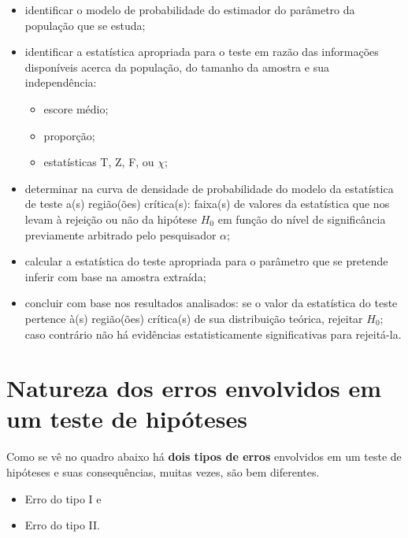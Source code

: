 \documentclass[
]{book}
\providecommand{\tightlist}{%
  \setlength{\itemsep}{0pt}\setlength{\parskip}{0pt}}
\begin{document}
\begin{itemize}
\tightlist
\item
  identificar o modelo de probabilidade do estimador do parâmetro da população que se estuda;\\
\item
  identificar a estatística apropriada para o teste em razão das informações disponíveis acerca da população, do tamanho da amostra e sua independência:

  \begin{itemize}
  \tightlist
  \item
    escore médio;
  \item
    proporção;
  \item
    estatísticas T, Z, F, ou \(\chi\);\\
  \end{itemize}
\item
  determinar na curva de densidade de probabilidade do modelo da estatística de teste a(s) região(ões) crítica(s): faixa(s) de valores da estatística que nos levam à rejeição ou não da hipótese \(H_{0}\) em função do nível de significância previamente arbitrado pelo pesquisador \(\alpha\);
\item
  calcular a estatística do teste apropriada para o parâmetro que se pretende inferir com base na amostra extraída;
\item
  concluir com base nos resultados analisados: se o valor da estatística do teste pertence à(s) região(ões) crítica(s) de sua distribuição teórica, rejeitar \(H_{0}\); caso contrário não há evidências estatisticamente significativas para rejeitá-la.
\end{itemize}

\hypertarget{natureza-dos-erros-envolvidos-em-um-teste-de-hipuxf3teses}{%
\section{Natureza dos erros envolvidos em um teste de hipóteses}\label{natureza-dos-erros-envolvidos-em-um-teste-de-hipuxf3teses}}

Como se vê no quadro abaixo há \textbf{dois tipos de erros} envolvidos em um teste de hipóteses e suas consequências, muitas vezes, são bem diferentes.

\hfill\break

\begin{itemize}
\tightlist
\item
  Erro do tipo I e
\item
  Erro do tipo II.
\end{itemize}
\end{document}
